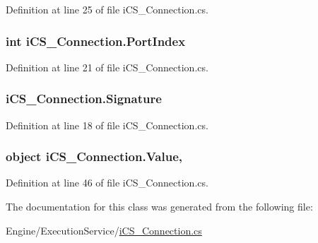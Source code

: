 Definition at line 25 of file i\+C\+S\+\_\+\+Connection.\+cs.

\hypertarget{classi_c_s___connection_a5be393593433195d9ecac7b2af5b5d61}{
\subsubsection[{Port\+Index}]{\setlength{\rightskip}{0pt plus 5cm}int i\+C\+S\+\_\+\+Connection.\+Port\+Index\hspace{0.3cm}{\ttfamily [get]}}}\label{classi_c_s___connection_a5be393593433195d9ecac7b2af5b5d61}


Definition at line 21 of file i\+C\+S\+\_\+\+Connection.\+cs.

\hypertarget{classi_c_s___connection_a0da9c6820b1c1ffa79dd4b6c579663d4}{
\subsubsection[{Signature}]{ i\+C\+S\+\_\+\+Connection.\+Signature\hspace{0.3cm}{\ttfamily [get]}}}\label{classi_c_s___connection_a0da9c6820b1c1ffa79dd4b6c579663d4}


Definition at line 18 of file i\+C\+S\+\_\+\+Connection.\+cs.

\hypertarget{classi_c_s___connection_ae2e972595fe941e54083006aefac72cd}{
\subsubsection[{Value}]{\setlength{\rightskip}{0pt plus 5cm}object i\+C\+S\+\_\+\+Connection.\+Value\hspace{0.3cm}{\ttfamily [get]}, {\ttfamily [set]}}}\label{classi_c_s___connection_ae2e972595fe941e54083006aefac72cd}


Definition at line 46 of file i\+C\+S\+\_\+\+Connection.\+cs.



The documentation for this class was generated from the following file\+:\begin{DoxyCompactItemize}
\item 
Engine/\+Execution\+Service/\hyperlink{i_c_s___connection_8cs}{i\+C\+S\+\_\+\+Connection.\+cs}\end{DoxyCompactItemize}
